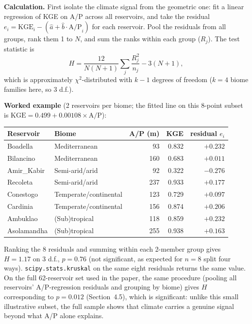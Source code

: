 \documentclass[12pt,authoryear]{elsarticle}
\begin{document}
\textbf{Calculation.} First isolate the climate signal from the geometric
one: fit a linear regression of KGE on A/P across all reservoirs, and take
the residual $e_i = \mathrm{KGE}_i - (\hat a + \hat b \cdot \mathrm{A/P}_i)$
for each reservoir. Pool the residuals from all groups, rank them 1 to $N$,
and sum the ranks within each group ($R_j$). The test statistic is
\[
H = \frac{12}{N(N+1)} \sum_j \frac{R_j^2}{n_j} - 3(N+1),
\]
which is approximately $\chi^2$-distributed with $k-1$ degrees of freedom
($k=4$ biome families here, so 3 d.f.).

\textbf{Worked example} (2 reservoirs per biome; the fitted line on this
8-point subset is $\mathrm{KGE} = 0.499 + 0.00108\times\mathrm{A/P}$):

\begin{center}
\begin{tabular}{llrrr}
\toprule
Reservoir & Biome & A/P (m) & KGE & residual $e_i$ \\
\midrule
Boadella    & Mediterranean          & 93  & 0.832 & $+0.232$ \\
Bilancino   & Mediterranean          & 160 & 0.683 & $+0.011$ \\
Amir\_Kabir & Semi-arid/arid         & 92  & 0.322 & $-0.276$ \\
Recoleta    & Semi-arid/arid         & 237 & 0.933 & $+0.177$ \\
Conestogo   & Temperate/continental  & 123 & 0.729 & $+0.097$ \\
Cardinia    & Temperate/continental  & 156 & 0.874 & $+0.206$ \\
Ambuklao    & (Sub)tropical          & 118 & 0.859 & $+0.232$ \\
Asolamandha & (Sub)tropical          & 255 & 0.938 & $+0.163$ \\
\bottomrule
\end{tabular}
\end{center}

Ranking the 8 residuals and summing within each 2-member group gives
$H = 1.17$ on 3 d.f., $p = 0.76$ (not significant, as expected for
$n=8$ split four ways). \texttt{scipy.stats.kruskal} on the same eight
residuals returns the same value. On the full 62-reservoir set used in the
paper, the same procedure (pooling all reservoirs' A/P-regression residuals
and grouping by biome) gives $H$ corresponding to $p = 0.012$
(Section~4.5), which is significant: unlike this small illustrative subset,
the full sample shows that climate carries a genuine signal beyond what A/P
alone explains.



\end{document}
